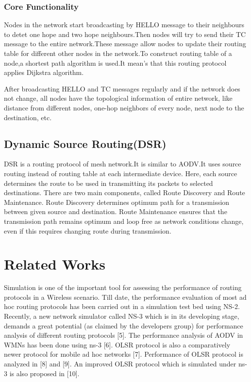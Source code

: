 \documentclass[12pt,a4paper]{report}
\begin{document}
\subsubsection{Core Functionality}
Nodes in the network start broadcasting by HELLO message to their neighbours to detet one hope and two hope neighbours.Then nodes will try to send their TC message to the entire network.These message allow nodes to update their routing table for different  other nodes in the network.To construct routing table of a node,a shortest path algorithm is used.It mean’s  that this routing protocol applies Dijkstra algorithm.

After broadcasting HELLO and TC messages regularly and if the network does
not change, all nodes have the topological information of  entire network, like distance from different nodes, one-hop neighbors of every node, next node to the
destination, etc.
\subsection{Dynamic Source Routing(DSR)}
DSR is a routing protocol of mesh network.It is similar to AODV.It uses source routing instead of routing table at each intermediate device.
Here, each source determines the route to be used in transmitting its packets to selected destinations. There are two main components, called Route Discovery and Route Maintenance. Route Discovery determines  optimum path for a transmission between  given source and destination. Route Maintenance ensures that the transmission path remains optimum and loop free as network conditions change, even if this requires changing route during  transmission.

\section{Related Works}
Simulation is one of the important tool for assessing the
performance of routing protocols in a Wireless scenario. Till
date, the performance evaluation of most ad hoc routing
protocols has been carried out in a simulation test bed using
NS-2. Recently, a new network simulator called NS-3 which is in its developing stage, demands a great
potential (as claimed by the developers group) for performance analysis of different routing protocols [5].
The performance analysis of AODV in WMNs has been done using ns-3 [6]. OLSR protocol is also a comparatively newer protocol for mobile ad hoc networks [7]. Performance of OLSR protocol is analyzed in [8] and [9]. An improved OLSR protocol which is simulated under ns-3 is also proposed in [10]. 
\end{document}
